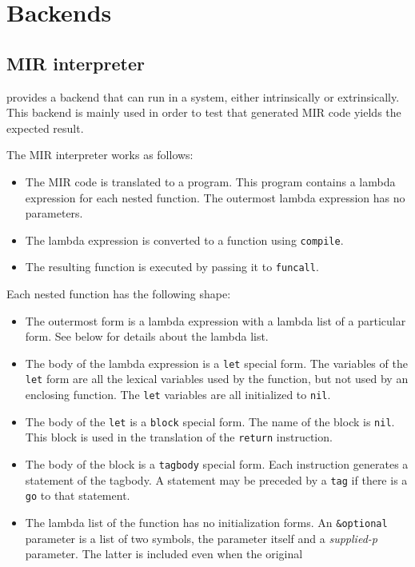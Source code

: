 \chapter{Backends}

\section{MIR interpreter}

\sysname{} provides a backend that can run in a \commonlisp{} system,
either intrinsically or extrinsically.  This backend is mainly used
in order to test that generated MIR code yields the expected result. 

The MIR interpreter works as follows:

\begin{itemize}
\item The MIR code is translated to a \commonlisp{} program.  This
  program contains a lambda expression for each nested function.  The
  outermost lambda expression has no parameters.
\item The lambda expression is converted to a function using
  \texttt{compile}. 
\item The resulting function is executed by passing it to
  \texttt{funcall}. 
\end{itemize}

Each nested function has the following shape:

\begin{itemize}
\item The outermost form is a lambda expression with a lambda list of
  a particular form.  See below for details about the lambda list.
\item The body of the lambda expression is a \texttt{let} special
  form.  The variables of the \texttt{let} form are all the lexical
  variables used by the function, but not used by an enclosing
  function.  The \texttt{let} variables are all initialized to
  \texttt{nil}. 
\item The body of the \texttt{let} is a \texttt{block} special form.
  The name of the block is \texttt{nil}.  This block is used in the
  translation of the \texttt{return} instruction.  
\item The body of the block is a \texttt{tagbody} special form.  Each
  instruction generates a statement of the tagbody.  A statement may
  be preceded by a \texttt{tag} if there is a \texttt{go} to that
  statement. 
\end{itemize}

\begin{itemize}
\item The lambda list of the function has no initialization forms.
  An \texttt{\&optional} parameter is a list of two symbols, the
  parameter itself and a \emph{supplied-p} parameter.  The latter is
  included even when the original 
\end{itemize}

